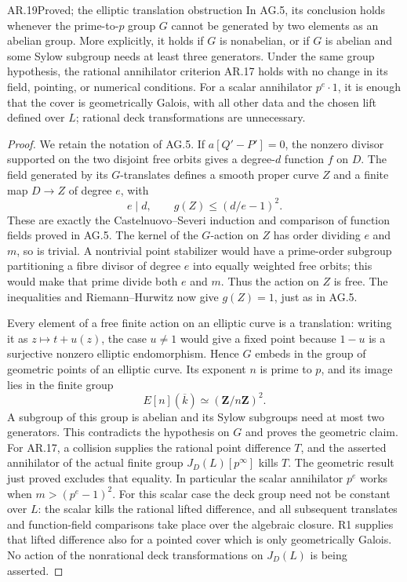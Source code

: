 \begin{claim}{AR.19}{Proved; the elliptic translation obstruction}
In AG.5, its conclusion holds whenever the prime-to-$p$
group $G$ cannot be generated by two elements as an abelian
group. More explicitly, it holds if $G$ is nonabelian, or
if $G$ is abelian and some Sylow subgroup needs at least
three generators. Under the same group hypothesis, the
rational annihilator criterion AR.17 holds with no change
in its field, pointing, or numerical conditions.
For a scalar annihilator $p^e\cdot1$, it is enough that
the cover is geometrically Galois, with all other data
and the chosen lift defined over $L$; rational deck
transformations are unnecessary.
\end{claim}
\begin{proof}
We retain the notation of AG.5. If $a[Q'-P']=0$, the
nonzero divisor supported on the two disjoint free orbits
gives a degree-$d$ function $f$ on $D$. The field generated
by its $G$-translates defines a smooth proper curve $Z$ and
a finite map $D\to Z$ of degree $e$, with
\[
 e\mid d,\qquad g(Z)\le(d/e-1)^2.
\]
These are exactly the Castelnuovo--Severi induction and
comparison of function fields proved in AG.5. The kernel
of the $G$-action on $Z$ has order dividing $e$ and $m$,
so is trivial. A nontrivial point stabilizer would have
a prime-order subgroup partitioning a fibre divisor of
degree $e$ into equally weighted free orbits; this would
make that prime divide both $e$ and $m$. Thus the action
on $Z$ is free. The inequalities and Riemann--Hurwitz now
give $g(Z)=1$, just as in AG.5.

Every element of a free finite action on an elliptic
curve is a translation: writing it as $z\mapsto t+u(z)$,
the case $u\ne1$ would give a fixed point because $1-u$
is a surjective nonzero elliptic endomorphism. Hence $G$
embeds in the group of geometric points of an elliptic
curve. Its exponent $n$ is prime to $p$, and its image
lies in the finite group
\[
                  E[n](\overline k)\simeq
                  (\mathbf Z/n\mathbf Z)^2.
\]
A subgroup of this group is abelian and its Sylow
subgroups need at most two generators. This contradicts
the hypothesis on $G$ and proves the geometric claim.
For AR.17, a collision supplies the rational point
difference $T$, and the asserted annihilator of the
actual finite group $J_D(L)[p^\infty]$ kills $T$.
The geometric result just proved excludes that equality.
In particular the scalar annihilator $p^e$ works when
$m>(p^e-1)^2$. For this scalar case the deck group need
not be constant over $L$: the scalar kills the rational
lifted difference, and all subsequent translates and
function-field comparisons take place over the algebraic
closure. R1 supplies that lifted difference also for a
pointed cover which is only geometrically Galois. No action
of the nonrational deck transformations on $J_D(L)$ is
being asserted.
\end{proof}

